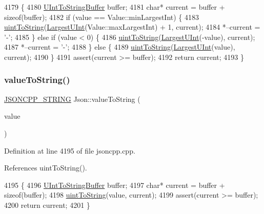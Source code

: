 \begin{DoxyCode}
4179                                                \{
4180   \hyperlink{namespace_json_a602bcf69c2042fb61c3b243cb16f04ca}{UIntToStringBuffer} buffer;
4181   \textcolor{keywordtype}{char}* current = buffer + \textcolor{keyword}{sizeof}(buffer);
4182   \textcolor{keywordflow}{if} (value == Value::minLargestInt) \{
4183     \hyperlink{namespace_json_ac1ffd21a9e55122014353c773ccc496e}{uintToString}(\hyperlink{namespace_json_ae202ecad69725e23443f465e257456d0}{LargestUInt}(Value::maxLargestInt) + 1, current);
4184     *--current = \textcolor{charliteral}{'-'};
4185   \} \textcolor{keywordflow}{else} \textcolor{keywordflow}{if} (value < 0) \{
4186     \hyperlink{namespace_json_ac1ffd21a9e55122014353c773ccc496e}{uintToString}(\hyperlink{namespace_json_ae202ecad69725e23443f465e257456d0}{LargestUInt}(-value), current);
4187     *--current = \textcolor{charliteral}{'-'};
4188   \} \textcolor{keywordflow}{else} \{
4189     \hyperlink{namespace_json_ac1ffd21a9e55122014353c773ccc496e}{uintToString}(\hyperlink{namespace_json_ae202ecad69725e23443f465e257456d0}{LargestUInt}(value), current);
4190   \}
4191   assert(current >= buffer);
4192   \textcolor{keywordflow}{return} current;
4193 \}
\end{DoxyCode}
\mbox{\label{namespace_json_a6283ea3db02efe9104ae6baff698245a}} 
\subsubsection{\texorpdfstring{value\+To\+String()}{valueToString()}\hspace{0.1cm}{\footnotesize\ttfamily [4/6]}}
{\footnotesize\ttfamily \hyperlink{json_8h_a1e723f95759de062585bc4a8fd3fa4be}{J\+S\+O\+N\+C\+P\+P\+\_\+\+S\+T\+R\+I\+NG} Json\+::value\+To\+String (\begin{DoxyParamCaption}\item[{\hyperlink{namespace_json_ae202ecad69725e23443f465e257456d0}{Largest\+U\+Int}}]{value }\end{DoxyParamCaption})}



Definition at line 4195 of file jsoncpp.\+cpp.



References uint\+To\+String().


\begin{DoxyCode}
4195                                                 \{
4196   \hyperlink{namespace_json_a602bcf69c2042fb61c3b243cb16f04ca}{UIntToStringBuffer} buffer;
4197   \textcolor{keywordtype}{char}* current = buffer + \textcolor{keyword}{sizeof}(buffer);
4198   \hyperlink{namespace_json_ac1ffd21a9e55122014353c773ccc496e}{uintToString}(value, current);
4199   assert(current >= buffer);
4200   \textcolor{keywordflow}{return} current;
4201 \}
\end{DoxyCode}
\mbox{\label{namespace_json_a3cf0c8dbbdb898c4a6fad54670b34bd1}} 
